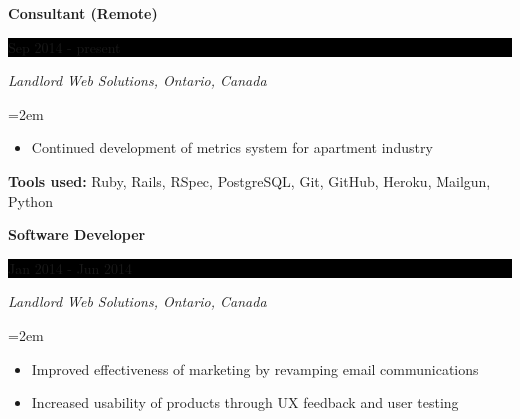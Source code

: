 \documentclass[paper=a4,fontsize=11pt]{scrartcl} %
\newcommand{\sepspace}{\vspace*{1em}}   %
\newcommand{\EducationEntry}[4]{
    \noindent \textbf{#1} \hfill      %
    \colorbox{Black}{
      \parbox{8.5em}{
      \hfill\color{White}#2}} \par  %
    \noindent \textit{#3} \par        %
    \noindent\hangindent=2em\hangafter=0 \small #4 %
    \normalsize \par}
\newcommand{\WorkEntry}[4]{       %
    \noindent \textbf{#1} \hfill      %
    \colorbox{Black}{%
      \parbox{9em}{%
      \hfill\color{White}#2}} \par   %
        \noindent \textit{#3} \par        %
    \noindent\hangindent=2em\hangafter=0 \small #4 %
    \normalsize \par}
\begin{document}
\WorkEntry{Consultant (Remote)}{Sep 2014 - present}
{Landlord Web Solutions, Ontario, Canada}
{
 \begin{itemize} \itemsep -1pt
   \item Continued development of metrics system for apartment industry
 \end{itemize}
 \textbf{Tools used:} Ruby, Rails, RSpec, PostgreSQL, Git, GitHub, Heroku, Mailgun, Python
}
\sepspace

\WorkEntry{Software Developer}{Jan 2014 - Jun 2014}
{Landlord Web Solutions, Ontario, Canada}
{
 \begin{itemize} \itemsep -1pt
   \item Improved effectiveness of marketing by revamping email communications
   \item Increased usability of products through UX feedback and user testing

\end{itemize}}
\end{document}
